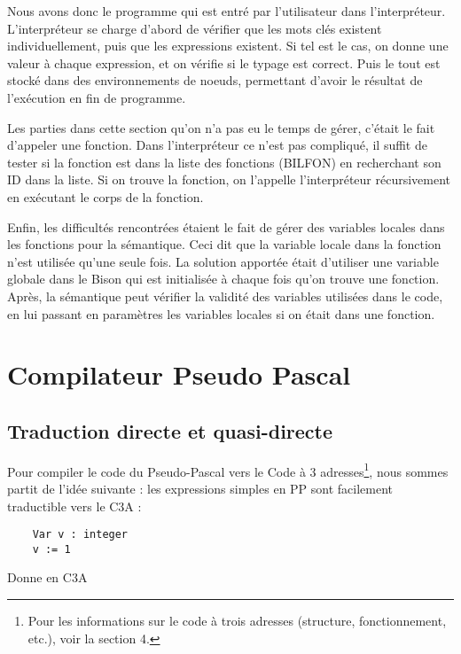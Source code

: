 \documentclass{article}
\begin{document}
\bigbreak

Nous avons donc le programme qui est entré par l'utilisateur dans l'interpréteur. L’interpréteur se charge d'abord de vérifier que les mots clés existent individuellement, puis que les expressions existent.
Si tel est le cas, on donne une valeur à chaque expression, et on vérifie si le typage est correct.
Puis le tout est stocké dans des environnements de noeuds, permettant d'avoir le résultat de l’exécution en fin de programme.

\bigbreak

Les parties dans cette section qu'on n'a pas eu le temps de gérer, c'était le fait d'appeler une fonction.
Dans l'interpréteur ce n'est pas compliqué, il suffit de tester si la fonction est dans la liste des fonctions (BILFON) en recherchant son ID dans la liste. Si on trouve la fonction, on l'appelle l'interpréteur récursivement en exécutant le corps de la fonction.

\bigbreak

Enfin, les difficultés rencontrées étaient le fait de gérer des variables locales dans les fonctions pour la sémantique. Ceci dit que la variable locale dans la fonction n'est utilisée qu’une seule fois.
La solution apportée était d'utiliser une variable globale dans le Bison qui est initialisée à chaque fois qu'on trouve une fonction.
Après, la sémantique peut vérifier la validité des variables utilisées dans le code, en lui passant en paramètres les variables locales si on était dans une fonction.


\newpage
\section{Compilateur Pseudo Pascal}

\subsection{Traduction directe et quasi-directe}
Pour compiler le code du Pseudo-Pascal vers le Code à 3 adresses\footnote{Pour les informations sur le code à trois adresses (structure, fonctionnement, etc.), voir la section 4.}, nous sommes partit de l'idée suivante : les expressions simples en PP sont facilement traductible vers le C3A :

\begin{lstlisting}
    Var v : integer
    v := 1
\end{lstlisting}

Donne en C3A
\end{document}
